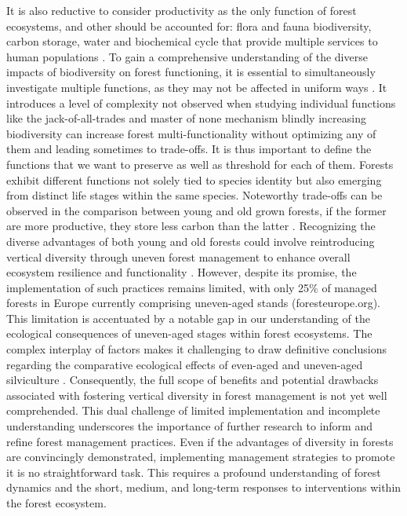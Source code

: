 \documentclass{article}
\begin{document}
It is also reductive to consider productivity as the only function of forest ecosystems, and other should be accounted for: flora and fauna biodiversity, carbon storage, water and biochemical cycle that provide multiple services to human populations \autocite{aertsForestRestorationBiodiversity2011}.
To gain a comprehensive understanding of the diverse impacts of biodiversity on forest functioning, it is essential to simultaneously investigate multiple functions, as they may not be affected in uniform ways \autocite{korboulewskyHowTreeDiversity2016}. It introduces a level of complexity not observed when studying individual functions like the jack-of-all-trades and master of none mechanism \autocite{vanderplasJackofalltradesEffectsDrive2016} blindly increasing biodiversity can increase forest multi-functionality without optimizing any of them and leading sometimes to trade-offs. It is thus important to define the functions that we want to preserve as well as threshold for each of them. 
Forests exhibit different functions not solely tied to species identity but also emerging from distinct life stages within the same species. Noteworthy trade-offs can be observed in the comparison between young and old grown forests, if the former are more productive, they store less carbon than the latter \autocite{caspersenSuccessionalDiversityForest2001}. Recognizing the diverse advantages of both young and old forests could involve reintroducing vertical diversity through uneven forest management to enhance overall ecosystem resilience and functionality \autocite{guldinRoleUnevenAgedSilviculture1996}. However, despite its promise, the implementation of such practices remains limited, with only 25\% of managed forests in Europe currently comprising uneven-aged stands (foresteurope.org).
This limitation is accentuated by a notable gap in our understanding of the ecological consequences of uneven-aged stages within forest ecosystems. The complex interplay of factors makes it challenging to draw definitive conclusions regarding the comparative ecological effects of even-aged and uneven-aged silviculture \autocite{noletComparingEffectsEven2018}. Consequently, the full scope of benefits and potential drawbacks associated with fostering vertical diversity in forest management is not yet well comprehended. This dual challenge of limited implementation and incomplete understanding underscores the importance of further research to inform and refine forest management practices.
Even if the advantages of diversity in forests are convincingly demonstrated, implementing management strategies to promote it is no straightforward task. This requires a profound understanding of forest dynamics and the short, medium, and long-term responses to interventions within the forest ecosystem.
\end{document}
